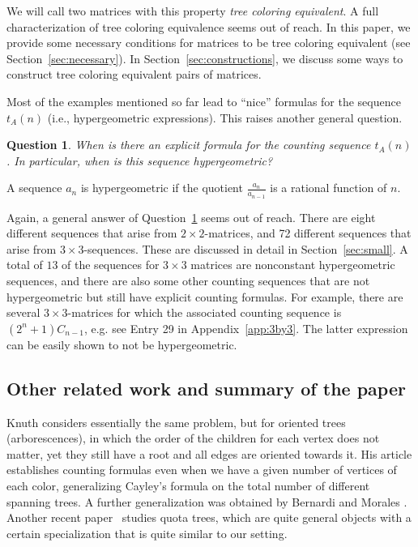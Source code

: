 \documentclass[12pt]{amsart}
\newtheorem{question}{Question}
\begin{document}
We will call two matrices with this property \emph{tree coloring equivalent}. A full characterization of tree coloring equivalence seems out of reach. In this paper, we provide some necessary conditions for matrices to be tree coloring equivalent (see Section~\ref{sec:necessary}). In Section~\ref{sec:constructions}, we discuss some ways to construct tree coloring equivalent pairs of matrices.

Most of the examples mentioned so far lead to ``nice'' formulas for the sequence $t_A(n)$ (i.e., hypergeometric expressions). This raises another general question.

\begin{question}
\label{q:2}
When is there an explicit formula for the counting sequence $t_A(n)$. In particular, when is this sequence hypergeometric?
\end{question}
A sequence $a_n$ is hypergeometric if the quotient $\frac{a_n}{a_{n-1}}$ is a rational function of $n$.

Again, a general answer of Question~\ref{q:2} seems out of reach. There are eight different sequences that arise from $2 \times 2$-matrices, and 72 different sequences that arise from $3 \times 3$-sequences. These are discussed in detail in Section~\ref{sec:small}. A total of $13$ of the sequences for $3\times3$ matrices are nonconstant hypergeometric sequences, and there are also some other counting sequences that are not hypergeometric but still have explicit counting formulas. For example, there are several $3 \times 3$-matrices for which the associated counting sequence is $(2^n+1)C_{n-1}$, e.g. see Entry 29 in Appendix~\ref{app:3by3}. The latter expression can be easily shown to not be hypergeometric. 
\subsection{Other related work and summary of the paper}

Knuth \cite[Section~3]{knuth1968another} considers essentially the same problem, but for oriented trees (arborescences), in which the order of the children for each vertex does not matter, yet they still have a root and all edges are oriented towards it. 
His article establishes counting formulas even when we have a given number of vertices of each color, generalizing Cayley's formula on the total number of different spanning trees. 
A further generalization was obtained by Bernardi and Morales \cite{bernardi2014counting}. 
Another recent paper~\cite{white2024quota} studies quota trees, which are quite general objects with a certain specialization that is quite similar to our setting.
\end{document}
